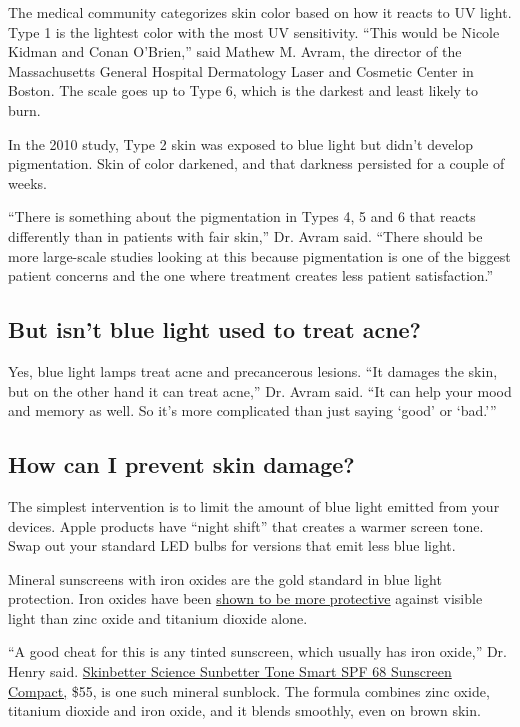 The medical community categorizes skin color based on how it reacts to
UV light. Type 1 is the lightest color with the most UV sensitivity.
``This would be Nicole Kidman and Conan O'Brien,'' said Mathew M. Avram,
the director of the Massachusetts General Hospital Dermatology Laser and
Cosmetic Center in Boston. The scale goes up to Type 6, which is the
darkest and least likely to burn.

In the 2010 study, Type 2 skin was exposed to blue light but didn't
develop pigmentation. Skin of color darkened, and that darkness
persisted for a couple of weeks.

``There is something about the pigmentation in Types 4, 5 and 6 that
reacts differently than in patients with fair skin,'' Dr. Avram said.
``There should be more large-scale studies looking at this because
pigmentation is one of the biggest patient concerns and the one where
treatment creates less patient satisfaction.''

\hypertarget{but-isnt-blue-light-used-to-treat-acne}{%
\subsection{But isn't blue light used to treat
acne?}\label{but-isnt-blue-light-used-to-treat-acne}}

Yes, blue light lamps treat acne and precancerous lesions. ``It damages
the skin, but on the other hand it can treat acne,'' Dr. Avram said.
``It can help your mood and memory as well. So it's more complicated
than just saying `good' or `bad.'''

\hypertarget{how-can-i-prevent-skin-damage}{%
\subsection{How can I prevent skin
damage?}\label{how-can-i-prevent-skin-damage}}

The simplest intervention is to limit the amount of blue light emitted
from your devices. Apple products have ``night shift'' that creates a
warmer screen tone. Swap out your standard LED bulbs for versions that
emit less blue light.

Mineral sunscreens with iron oxides are the gold standard in blue light
protection. Iron oxides have been
\href{https://www.ncbi.nlm.nih.gov/pmc/articles/PMC6718061/}{shown to be
more protective} against visible light than zinc oxide and titanium
dioxide alone.

``A good cheat for this is any tinted sunscreen, which usually has iron
oxide,'' Dr. Henry said.
\href{https://skinbetter.com/products/sunbetter-tone-smart-spf-68-sunscreen-compact/}{Skinbetter
Science Sunbetter Tone Smart SPF 68 Sunscreen Compact,} \$55, is one
such mineral sunblock. The formula combines zinc oxide, titanium dioxide
and iron oxide, and it blends smoothly, even on brown skin.


